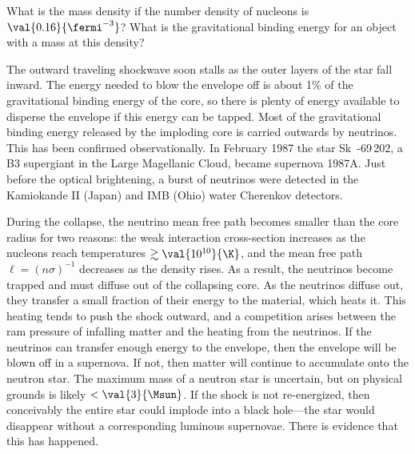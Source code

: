 \begin{exercisebox}
What is the mass density if the number density of nucleons is $\val{0.16}{\fermi^{-3}}$? What is the gravitational binding energy for an object with a mass  at this density?
\end{exercisebox}

The outward traveling shockwave soon stalls as the outer layers of the star fall inward. The energy needed to blow the envelope off is about 1\% of the gravitational binding energy of the core, so there is plenty of energy available to disperse the envelope if this energy can be tapped. Most of the gravitational binding energy released by the imploding core is carried outwards by neutrinos. This has been confirmed observationally\cite{Arnett1989Supernova-1987A}. In February 1987 the star Sk~-69\,202, a B3 supergiant in the Large Magellanic Cloud, became supernova 1987A. Just before the optical brightening, a burst of neutrinos were detected in 
the Kamiokande II (Japan) and IMB (Ohio) water Cherenkov detectors.

During the collapse, the neutrino mean free path becomes smaller than the core radius for two reasons: the weak interaction cross-section increases as the nucleons reach temperatures $\gtrsim\val{10^{10}}{\K}$, and the mean free path $\ell = (n\sigma)^{-1}$ decreases as the density rises.
As a result, the neutrinos become trapped and must diffuse out of the collapsing core. As the neutrinos diffuse out, they transfer a small fraction of their energy to the material, which heats it. This heating tends to push the shock outward, and a competition arises between the ram pressure of infalling matter and the heating from the neutrinos. If the neutrinos can transfer enough energy to the envelope, then the envelope will be blown off in a supernova. If not, then matter will continue to accumulate onto the neutron star. The maximum mass of a neutron star is uncertain, but on physical grounds is likely $< \val{3}{\Msun}$. If the shock is not re-energized, then conceivably the entire star could implode into a black hole---the star would disappear without a corresponding luminous supernovae. There is evidence that this has happened\cite{Adams2017The-search-for-}.


